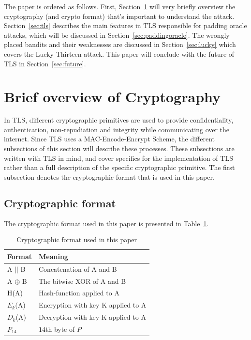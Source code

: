 \documentclass[10pt,conference,a4paper]{IEEEtran}
\begin{document}
The paper is ordered as follows. First, Section~\ref{sec:crypto} will very briefly overview the cryptography (and crypto format) that's important to understand the attack. Section~\ref{sec:tls} describes the main features in TLS responsible for padding oracle attacks, which will be discussed in Section~\ref{sec:paddingoracle}. The wrongly placed bandits and their weaknesses are discussed in Section~\ref{sec:lucky} which covers the Lucky Thirteen attack. This paper will conclude with the future of TLS in Section~\ref{sec:future}.



\section{Brief overview of Cryptography}
\label{sec:crypto}
In TLS, different cryptographic primitives are used to provide confidentiality, authentication, non-repudiation and integrity while communicating over the internet. Since TLS uses a MAC-Encode-Encrypt Scheme, the different subsections of this section will describe these processes. These subsections are written with TLS in mind, and cover specifics for the implementation of TLS rather than a full description of the specific cryptographic primitive. The first subsection denotes the cryptographic format that is used in this paper.

\subsection{Cryptographic format}
\label{sec:crypto:format}
The cryptographic format used in this paper is presented in Table~\ref{sec:crypto:format:table}.
\begin{table}[h]
    \begin{tabular}{l|l}
    Format & Meaning \\ \hline
    A $||$ B    & Concatenation of A and B  \\
    A $\oplus$ B  & The bitwise XOR of A and B     \\
    H(A)    & Hash-function applied to A    \\
    $E_k$(A)    & Encryption with key K applied to A    \\
    $D_k$(A)    & Decryption with key K applied to A    \\
    $P_{14}$    & $14$th byte of $P$ \\
    \end{tabular}
    \caption{Cryptographic format used in this paper}
    \label{sec:crypto:format:table}
\end{table}
\end{document}
